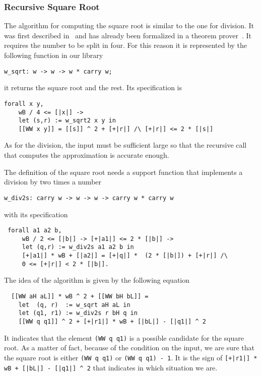 \subsubsection{Recursive Square Root}

The algorithm for computing the square root is similar to the one for division.
It was first described in~\cite{RecSqrt} and has already been formalized in a 
theorem prover~\cite{BerMagZim02}. It requires the number to be split
in four. For this reason it is represented by the following function in our
library
\begin{verbatim}
w_sqrt: w -> w -> w * carry w;
\end{verbatim}
it returns the square root and the rest.
Its specification is
\begin{verbatim}
forall x y,
    wB / 4 <= [|x|] ->
    let (s,r) := w_sqrt2 x y in
    [[WW x y]] = [[s]] ^ 2 + [+|r|] /\ [+|r|] <= 2 * [|s|]
\end{verbatim}
As for the division, the input must be sufficient large so that the recursive call
that computes the approximation is accurate enough. 

The definition of the square root needs a support function that implements a division
by two times a number
\begin{verbatim}
w_div2s: carry w -> w -> w -> carry w * carry w
\end{verbatim}
with its specification
\begin{verbatim}
 forall a1 a2 b,
     wB / 2 <= [|b|] -> [+|a1|] <= 2 * [|b|] ->
     let (q,r) := w_div2s a1 a2 b in
     [+|a1|] * wB + [|a2|] = [+|q|] *  (2 * [|b|]) + [+|r|] /\ 
     0 <= [+|r|] < 2 * [|b|].
\end{verbatim}
The idea of the algorithm is given by the following equation
\begin{verbatim}
  [[WW aH aL]] * wB ^ 2 + [[WW bH bL]] =
    let  (q, r)  := w_sqrt aH aL in
    let (q1, r1) := w_div2s r bH q in
    [[WW q q1]] ^ 2 + [+|r1|] * wB + [|bL|] - [|q1|] ^ 2 
\end{verbatim}
It indicates that the element {\tt (WW q q1)} is a possible candidate
for the square root. As a matter of fact, because of the condition on
the input, we are sure that the square root is either {\tt (WW q q1)} or
{\tt (WW q q1) - 1}. It is the sign of {\tt [+|r1|] * wB + 
[|bL|] - [|q1|] \^{} 2} that indicates in which situation we are. 